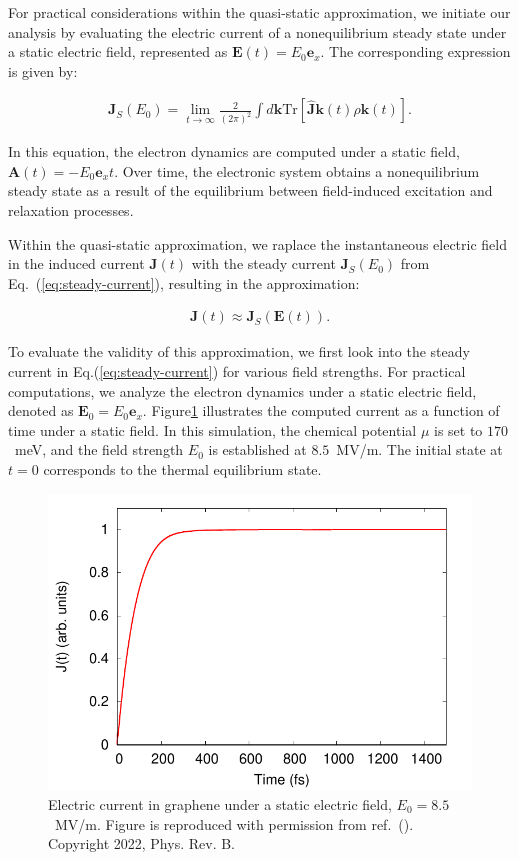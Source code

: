 For practical considerations within the quasi-static approximation, we initiate our analysis by evaluating the electric current of a nonequilibrium steady state under a static electric field, represented as $\mathbf E(t)=E_0 \mathbf e_x$. The corresponding expression is given by:

\begin{align}
	\mathbf J_S(E_0) = \lim_{t\rightarrow \infty}\frac{2}{(2\pi)^2}\int d\mathbf k \mathrm{Tr}\left[\hat{\boldsymbol{J}}{\boldsymbol{k}}(t)\rho{\boldsymbol{k}}(t)\right].
	\label{eq:steady-current}
\end{align}

In this equation, the electron dynamics are computed under a static field, $\mathbf{A}(t)=-E_0
	\mathbf{e}_x t$. Over time, the electronic system obtains a nonequilibrium steady state as a result
of the equilibrium between field-induced excitation and relaxation processes.

Within the quasi-static approximation, we raplace the instantaneous electric field in the induced current $\mathbf J(t)$ with the steady current $\mathbf J_S(E_0)$ from Eq.~(\ref{eq:steady-current}), resulting in the approximation:

\begin{align}
	\mathbf J(t)\approx \mathbf J_S\left( \mathbf E(t) \right).
	\label{eq:appendix-steady-current}
\end{align}

To evaluate the validity of this approximation, we first look into the steady current in
Eq.(\ref{eq:steady-current}) for various field strengths. For practical computations, we analyze
the electron dynamics under a static electric field, denoted as $\mathbf E_0=E_0\mathbf e_x$.
Figure\ref{fig:steady} illustrates the computed current as a function of time under a static field. In this simulation, the chemical potential $\mu$ is set to $170$~meV, and the field strength $E_0$ is established at $8.5$~MV/m. The initial state at $t=0$ corresponds to the thermal equilibrium state.
\begin{figure}[htbp]
	\centering
	\includegraphics[width=0.8\linewidth]{pic/steady_current_appendix.pdf}
	\caption{\label{fig:steady}
		Electric current in graphene under a static electric field, $E_0=8.5$~MV/m. Figure is reproduced with permission from ref.~(\cite{PhysRevB.106.024313}). Copyright 2022, Phys. Rev. B.}
\end{figure}

